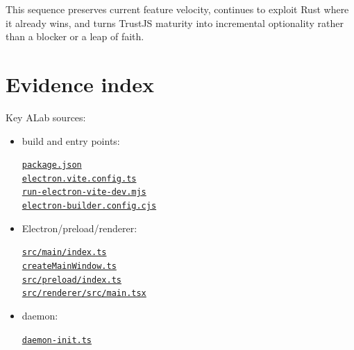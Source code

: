\documentclass[
  10pt,
  letterpaper,
]{article}
\providecommand{\tightlist}{%
  \setlength{\itemsep}{0pt}\setlength{\parskip}{0pt}}
\begin{document}
This sequence preserves current feature velocity, continues to exploit
Rust where it already wins, and turns TrustJS maturity into incremental
optionality rather than a blocker or a leap of faith.

\section{Evidence index}\label{evidence-index}

Key ALab sources:

\begin{itemize}
\tightlist
\item
  build and entry points:\par
  \href{https://github.com/andrewyatesai/orca-alab/blob/d3ba1bcb17324714a838b2970e04fcd96989e84f/package.json}{\texttt{package.json}}\\
  \href{https://github.com/andrewyatesai/orca-alab/blob/d3ba1bcb17324714a838b2970e04fcd96989e84f/electron.vite.config.ts}{\texttt{electron.vite.config.ts}}\\
  \href{https://github.com/andrewyatesai/orca-alab/blob/d3ba1bcb17324714a838b2970e04fcd96989e84f/config/scripts/run-electron-vite-dev.mjs}{\texttt{run-electron-vite-dev.mjs}}\\
  \href{https://github.com/andrewyatesai/orca-alab/blob/d3ba1bcb17324714a838b2970e04fcd96989e84f/config/electron-builder.config.cjs}{\texttt{electron-builder.config.cjs}}
\item
  Electron/preload/renderer:\par
  \href{https://github.com/andrewyatesai/orca-alab/blob/d3ba1bcb17324714a838b2970e04fcd96989e84f/src/main/index.ts}{\texttt{src/main/index.ts}}\\
  \href{https://github.com/andrewyatesai/orca-alab/blob/d3ba1bcb17324714a838b2970e04fcd96989e84f/src/main/window/createMainWindow.ts}{\texttt{createMainWindow.ts}}\\
  \href{https://github.com/andrewyatesai/orca-alab/blob/d3ba1bcb17324714a838b2970e04fcd96989e84f/src/preload/index.ts}{\texttt{src/preload/index.ts}}\\
  \href{https://github.com/andrewyatesai/orca-alab/blob/d3ba1bcb17324714a838b2970e04fcd96989e84f/src/renderer/src/main.tsx}{\texttt{src/renderer/src/main.tsx}}
\item
  daemon:\par
  \href{https://github.com/andrewyatesai/orca-alab/blob/d3ba1bcb17324714a838b2970e04fcd96989e84f/src/main/daemon/daemon-init.ts}{\texttt{daemon-init.ts}}\\

\end{itemize}
\end{document}
